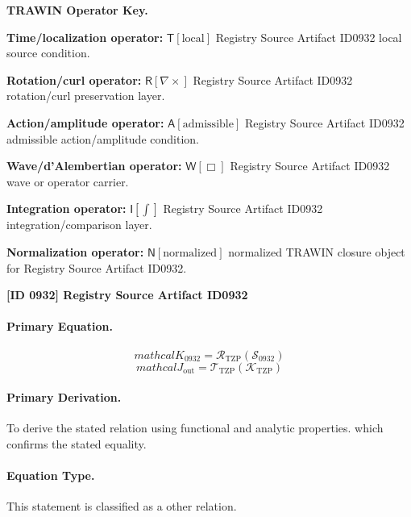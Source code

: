 \par\vspace{0.45\baselineskip}
\noindent\begin{minipage}[t]{\linewidth}
\begingroup
\small
\raggedright
\textbf{TRAWIN Operator Key.}\par
\noindent\textbf{Time/localization operator:} $\mathsf{T}\!\left[\mathrm{local}\right]$ Registry Source Artifact ID0932 local source condition.\par
\noindent\textbf{Rotation/curl operator:} $\mathsf{R}\!\left[\nabla\times\right]$ Registry Source Artifact ID0932 rotation/curl preservation layer.\par
\noindent\textbf{Action/amplitude operator:} $\mathsf{A}\!\left[\mathrm{admissible}\right]$ Registry Source Artifact ID0932 admissible action/amplitude condition.\par
\noindent\textbf{Wave/d'Alembertian operator:} $\mathsf{W}\!\left[\Box\right]$ Registry Source Artifact ID0932 wave or operator carrier.\par
\noindent\textbf{Integration operator:} $\mathsf{I}\!\left[\int\right]$ Registry Source Artifact ID0932 integration/comparison layer.\par
\noindent\textbf{Normalization operator:} $\mathsf{N}\!\left[\mathrm{normalized}\right]$ normalized TRAWIN closure object for Registry Source Artifact ID0932.\par
\endgroup
\end{minipage}

\clearpage
\noindent\textbf{[ID 0932] Registry Source Artifact ID0932}\par
\vspace{0.35em}
\paragraph{Primary Equation.}
\[
mathcal{K}_{0932}=\mathcal{R}_{\mathrm{TZP}}\!\left(\mathcal{S}_{0932}\right)
\]
\[
mathcal{J}_{\mathrm{out}} = \mathcal{T}_{\mathrm{TZP}}\!\left(\mathcal{K}_{\mathrm{TZP}}\right)
\]

\paragraph{Primary Derivation.}
To derive the stated relation using functional and analytic properties. which confirms the stated equality.
\paragraph{Equation Type.}
This statement is classified as a other relation.

